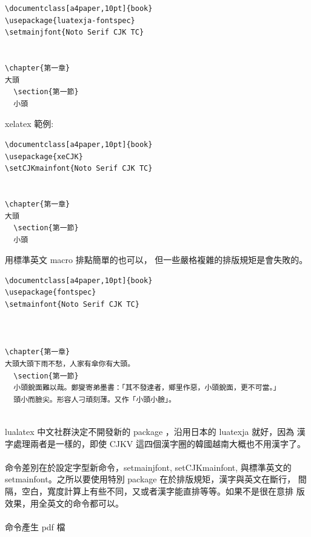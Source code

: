 \begin{verbatim}
\documentclass[a4paper,10pt]{book}
\usepackage{luatexja-fontspec}
\setmainjfont{Noto Serif CJK TC}


\chapter{第一章}
大頭
  \section{第一節}
  小頭

\end{verbatim}

xelatex 範例:

\begin{verbatim}
\documentclass[a4paper,10pt]{book}
\usepackage{xeCJK}
\setCJKmainfont{Noto Serif CJK TC}


\chapter{第一章}
大頭
  \section{第一節}
  小頭

\end{verbatim}

用標準英文 macro 排點簡單的也可以，
但一些嚴格複雜的排版規矩是會失敗的。

\begin{verbatim}
\documentclass[a4paper,10pt]{book}
\usepackage{fontspec}
\setmainfont{Noto Serif CJK TC}



\chapter{第一章}
大頭大頭下雨不愁，人家有傘你有大頭。
  \section{第一節}
  小頭銳面難以哉。鄭燮寄弟墨書：「其不發達者，鄉里作惡，小頭銳面，更不可當。」
  頭小而臉尖。形容人刁頑刻薄。又作「小頭小臉」。


\end{verbatim}
lualatex 中文社群決定不開發新的 package ，沿用日本的 luatexja 就好，因為
漢字處理兩者是一樣的，即使 CJKV 這四個漢字圈的韓國越南大概也不用漢字了。
\\\\
命令差別在於設定字型新命令，setmainjfont, setCJKmainfont, 與標準英文的
setmainfont。之所以要使用特別 package 在於排版規矩，漢字與英文在斷行，
間隔，空白，寬度計算上有些不同，又或者漢字能直排等等。如果不是很在意排
版效果，用全英文的命令都可以。
\\\\
命令產生 pdf 檔

